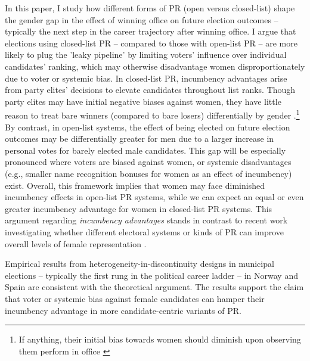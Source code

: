 \documentclass[12pt]{article}
\begin{document}
In this paper, I study how different forms of PR (open versus closed-list) shape the gender gap in the effect of winning office on future election outcomes -- typically the next step in the career trajectory after winning office. I argue that elections using closed-list PR -- compared to those with open-list PR -- are more likely to plug the 'leaky pipeline' by limiting voters' influence over individual candidates' ranking, which may otherwise disadvantage women disproportionately due to voter or systemic bias. In closed-list PR, incumbency advantages arise from party elites' decisions to elevate candidates throughout list ranks. Though party elites may have initial negative biases against women, they have little reason to treat bare winners (compared to bare losers) differentially by gender \citep{luhiste2015,hazan2006a}.\footnote{If anything, their initial bias towards women should diminish upon observing them perform in office \citep{kjaer2019}} By contrast, in open-list systems, the effect of being elected on future election outcomes may be differentially greater for men due to a larger increase in personal votes for barely elected male candidates. This gap will be especially pronounced where voters are biased against women, or systemic disadvantages (e.g., smaller name recognition bonuses for women as an effect of incumbency) exist. Overall, this framework implies that women may face diminished incumbency effects in open-list PR systems, while we can expect an equal or even greater incumbency advantage for women in closed-list PR systems. This argument regarding \emph{incumbency advantages} stands in contrast to recent work investigating whether different electoral systems or kinds of PR can improve overall levels of female representation \citep{stegmaier2014women,golder2017a}.

Empirical results from heterogeneity-in-discontinuity designs in municipal elections -- typically the first rung in the political career ladder \citep{cirone2020} -- in Norway and Spain are consistent with the theoretical argument. The results support the claim that voter or systemic bias against female candidates can hamper their incumbency advantage in more candidate-centric variants of PR.
\end{document}
